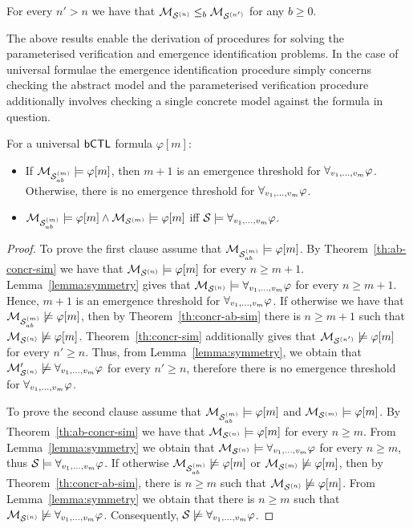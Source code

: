 \begin{theorem}
\label{th:concr-sim}
For every $n' > n$ we have that $\mathcal{M}_{\mathcal{S}^{(n)}} \leq_b \mathcal{M}_{\mathcal{S}^{(n')}}$ for any
$b \geq 0$.
\end{theorem}

The above results enable the derivation of procedures for solving
the parameterised verification and emergence identification problems. In the case
of universal formulae the emergence identification procedure simply concerns
checking the abstract model and the parameterised verification procedure 
additionally involves checking a single concrete model against the formula in
question.

\begin{corollary}
\label{cor:universal}
For a universal $\sf{bCTL}$ formula $\varphi[m]$:
\begin{itemize}
    \item  If $\mathcal{M}_{\mathcal{S}_{ab}^{(m)}} \models \varphi[m]$, then $m + 1$ is an emergence
    threshold for $\forall_{v_1,\ldots,v_m} \varphi$. Otherwise, there is no emergence threshold for
    $\forall_{v_1,\ldots,v_m} \varphi$.
    \item $\mathcal{M}_{\mathcal{S}_{ab}^{(m)}} \models \varphi[m] \land \mathcal{M}_{\mathcal{S}^{(m)}} \models \varphi[m]$ iff
    $\mathcal S \models \forall_{v_1,\ldots,v_m} \varphi$.
\end{itemize}
\end{corollary}
\begin{proof}
To prove the first clause assume that $\mathcal{M}_{\mathcal{S}_{ab}^{(m)}} \models \varphi[m]$. By
Theorem~\ref{th:ab-concr-sim} we have that $\mathcal{M}_{\mathcal{S}^{(n)}} \models \varphi[m]$ for
every $n \geq m+1$. Lemma~\ref{lemma:symmetry} gives that  $\mathcal{M}_{\mathcal{S}^{(n)}} \models
\forall_{v_1,\ldots,v_m} \varphi$ for every $n \geq m+1$. Hence, $m+1$ is an emergence threshold for
$\forall_{v_1,\ldots,v_m} \varphi$. If otherwise we have that  $\mathcal{M}_{\mathcal{S}_{ab}^{(m)}} \not \models \varphi[m]$,
then by Theorem~\ref{th:concr-ab-sim} there is $n \geq m+1$ such that $\mathcal{M}_{\mathcal{S}^{(n)}}
\not \models \varphi[m]$. Theorem~\ref{th:concr-sim} additionally gives that
$\mathcal{M}_{\mathcal{S}^{(n')}} \not \models \varphi[m]$ for every $n' \geq n$. Thus, from
Lemma~\ref{lemma:symmetry}, we obtain that $\mathcal{M}_{\mathcal{S}^{(n)}}' \not \models \forall_{v_1,\ldots,v_m} \varphi$
for every $n' \geq n$, therefore there is no emergence threshold for
$\forall_{v_1,\ldots,v_m} \varphi$.

To prove the second clause assume that $\mathcal{M}_{\mathcal{S}_{ab}^{(m)}} \models \varphi[m]$ and $\mathcal{M}_{\mathcal{S}^{(m)}} \models \varphi[m]$. By Theorem~\ref{th:ab-concr-sim} we have that $\mathcal{M}_{\mathcal{S}^{(n)}}
\models \varphi[m]$ for every $n \geq m$. From Lemma~\ref{lemma:symmetry} we
obtain that $\mathcal{M}_{\mathcal{S}^{(n)}} \models \forall_{v_1,\ldots,v_m} \varphi$ for every $n \geq m$, thus $\mathcal S
\models \forall_{v_1,\ldots,v_m} \varphi$. If otherwise $\mathcal{M}_{\mathcal{S}_{ab}^{(m)}} \not \models \varphi[m]$ or $\mathcal{M}_{\mathcal{S}^{(m)}}
\not \models \varphi[m]$, then by Theorem~\ref{th:concr-ab-sim}, there is $n
\geq m$ such that $\mathcal{M}_{\mathcal{S}^{(n)}} \not \models \varphi[m]$.  From
Lemma~\ref{lemma:symmetry} we obtain that there is $n \geq m$ such that $\mathcal{M}_{\mathcal{S}^{(n)}}
\not \models \forall_{v_1,\ldots,v_m} \varphi$. Consequently, $\mathcal S \not \models \forall_{v_1,\ldots,v_m} \varphi$.
\end{proof}

